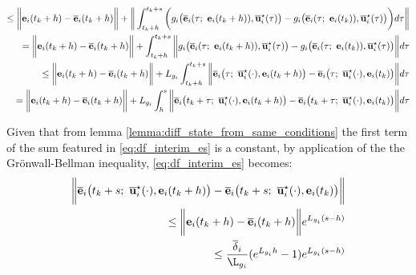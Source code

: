 \begin{gg_box}
\begin{align}
    \leq \bigg\| \vect{e}_i(t_k +h) - \overline{\vect{e}}_i(t_k + h) \bigg \|
    + \bigg\| \int_{t_k +h}^{t_k + s} \bigg( g_i\big(\overline{\vect{e}}_i(\tau;\ \vect{e}_i(t_k + h)), \overline{\vect{u}}_i^{\star}(\tau)\big)
    -  g_i\big(\overline{\vect{e}}_i(\tau;\ \vect{e}_i(t_k)), \overline{\vect{u}}_i^{\star}(\tau)\big) \bigg) d\tau \bigg\| \\
    = \bigg\| \vect{e}_i(t_k +h) - \overline{\vect{e}}_i(t_k + h) \bigg \|
    + \int_{t_k +h}^{t_k + s} \bigg\| g_i\big(\overline{\vect{e}}_i(\tau;\ \vect{e}_i(t_k + h)), \overline{\vect{u}}_i^{\star}(\tau)\big)
    -  g_i\big(\overline{\vect{e}}_i(\tau;\ \vect{e}_i(t_k)), \overline{\vect{u}}_i^{\star}(\tau)\big) \bigg\| d\tau \\
    \leq \bigg\| \vect{e}_i(t_k +h) - \overline{\vect{e}}_i(t_k + h) \bigg \|
    + L_{g_i} \int_{t_k +h}^{t_k + s} \bigg\| \overline{\vect{e}}_i\big(\tau;\ \overline{\vect{u}}_i^{\star}(\cdot), \vect{e}_i(t_k + h) \big)
    -  \overline{\vect{e}}_i\big(\tau;\ \overline{\vect{u}}_i^{\star}(\cdot), \vect{e}_i(t_k)\big) \bigg\| d\tau \\
    = \bigg\| \vect{e}_i(t_k +h) - \overline{\vect{e}}_i(t_k + h) \bigg \|
    + L_{g_i} \int_{h}^{s} \bigg\| \overline{\vect{e}}_i\big(t_k + \tau;\ \overline{\vect{u}}_i^{\star}(\cdot), \vect{e}_i(t_k + h) \big)
    -  \overline{\vect{e}}_i\big(t_k + \tau;\ \overline{\vect{u}}_i^{\star}(\cdot), \vect{e}_i(t_k)\big) \bigg\| d\tau \\
    \label{eq:df_interim_es}
\end{align}

Given that from lemma \eqref{lemma:diff_state_from_same_conditions}
the first term of the sum featured in \eqref{eq:df_interim_es} is a constant,
by application of the the Gr\"{o}nwall-Bellman inequality,
\eqref{eq:df_interim_es} becomes:
\begin{align}
  \bigg \| \overline{\vect{e}}_i\big(t_k + s;\ \overline{\vect{u}}_i^{\star}(\cdot), \vect{e}_i(t_k +h)\big)
    -\overline{\vect{e}}_i\big(t_k + s;\ \overline{\vect{u}}_i^{\star}(\cdot), \vect{e}_i(t_k)\big) \bigg \| \\
    \leq \bigg\| \vect{e}_i(t_k +h) - \overline{\vect{e}}_i(t_k + h) \bigg \| e^{L_{g_i}(s-h)} \\
    \leq \dfrac{\overline{\delta}_i}{\L_{g_i}} (e^{L_{g_i}h} - 1) e^{L_{g_i}(s-h)}
\end{align}
\end{gg_box}

